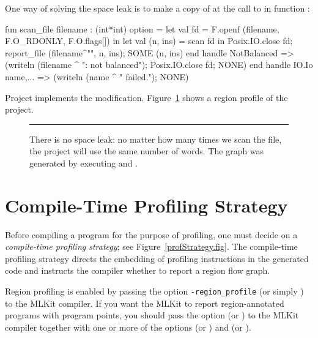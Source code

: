 \documentclass[12pt]{book}
\begin{document}
One way of solving the space leak is to make a copy of  at the call
to  in function :
\begin{smlcode}
  fun scan_file filename : (int*int) option =
      let val fd = F.openf (filename, F.O_RDONLY, F.O.flags[])
      in let val (n, ins) = scan fd
         in Posix.IO.close fd;
            report_file (filename^"", n, ins);
            SOME (n, ins)
         end handle NotBalanced =>
                    (writeln (filename ^ ": not balanced");
                     Posix.IO.close fd;
                     NONE)
      end handle IO.Io {name,...} =>
                 (writeln (name ^ " failed."); NONE)
\end{smlcode}
Project
%
%
%
 implements the modification.
Figure~\ref{scan_rev2.fig} shows a region profile of the 
project.
\begin{figure}
\caption{There is no space leak: no matter how many times we scan the file, the
  project will use the same number of words. The graph was generated by
  executing
  and
  .}
\label{scan_rev2.fig}
\medskip\hrule
\end{figure}

\section{Compile-Time Profiling Strategy}

Before compiling a program for the purpose of profiling, one must decide on a
%
%
%
\emph{compile-time profiling strategy}; see Figure~\ref{profStrategy.fig}.  The
compile-time profiling strategy directs the embedding of profiling instructions
in the generated code and instructs the compiler whether to report a region flow
graph.

Region profiling is enabled by passing the option
%
%
%
\lstinline{-region_profile} (or simply ) to the MLKit
compiler. If you want the MLKit to report region-annotated programs
with program points, you should pass the option
%
%
%
 (or ) to the MLKit compiler together
with one or more of the options
%
%
%
 (or ) and
%
%
%
 (or ).
\end{document}
